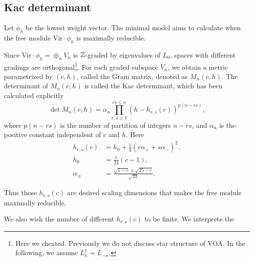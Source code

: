 \documentclass{article}
\begin{document}
\subsection{Kac determinant}
Let $\phi_h$ be the lowest weight vector. The minimal model aims to calculate when the free module $\mathrm{Vir}\cdot \phi_h$ is maximally reducible. 

Since $\mathrm{Vir}\cdot \phi_h = \oplus_{n}V_n$ is $\mathbb{Z}$-graded by eigenvalues of $L_0$, spaces with different gradings are orthogonal\footnote{Here we cheated. Previously we do not discuss star structure of VOA. In the following, we assume $L_n^\dagger = L_{-n}$.}. For each graded subspace $V_n$, we obtain a metric parametrized by $(c,h)$, called the Gram matrix, denoted as $M_n(c,h)$. The determinant of $M_n(c,h)$ is called the Kac determinant, which has been calculated explicitly
\[
\det{M_n(c,h)} = \alpha_n \prod_{r,s\geq 1}^{rs\leq n}\left(h-h_{r,s}(c)\right)^{p(n-rs)},
\]
where $p(n-rs)$ is the number of partition of integers $n-rs$, and $\alpha_n$ is the positive constant independent of $c$ and $h$. Here
\begin{align*}
    h_{r,s}(c) &= h_0 + \frac{1}{4}\left(r\alpha_++s\alpha_-\right)^2,\\
    h_0 &= \frac{1}{24}(c-1),\\
    \alpha_\pm &= \frac{\sqrt{1-c}\pm \sqrt{25-c}}{\sqrt{24}}.
\end{align*}

Thus those $h_{r,s}(c)$ are desired scaling dimensions that makes the free module maximally reducible.

We also wish the number of different $h_{r,s}(c)$ to be finite. We interprete the 


\end{document}

